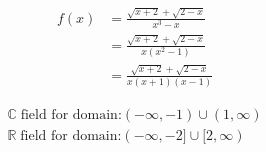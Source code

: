 \documentclass[17 pt]{extarticle}
\begin{document}
\vspace{5mm}

\begin{equation*}
    \begin{split}
        f(x) &= \frac{\sqrt{x+2} + \sqrt{2-x}}{x^3-x} \\
        &= \frac{\sqrt{x+2} + \sqrt{2-x}}{x(x^2 - 1)} \\
        &= \frac{\sqrt{x+2} + \sqrt{2-x}}{x(x+1)(x-1)}
    \end{split}
    \end{equation*}

\vspace{5mm}

\begin{equation*}
    \begin{split}
        \mathbb{C} \; \text{field for domain:} (- \infty, -1) \cup (1, \infty) \\
        \mathbb{R} \; \text{field for domain:} (- \infty, -2] \cup [2, \infty) \\
    \end{split}
    \end{equation*}
\enddocument{}
\end{document}
